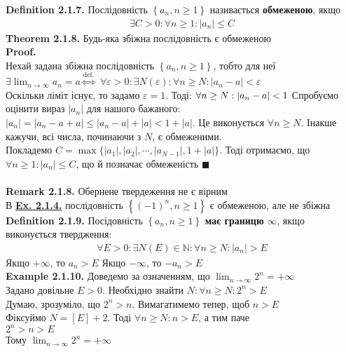 \documentclass[a4paper, 14pt]{extarticle}
\def\bigline{\vspace{5mm}\\}
\def\bigline{\vspace{5mm}\\}
\def\qed{$\blacksquare$}
\def\sequence#1{$\displaystyle \left\{ {#1}, n\geq1 \right\}$}
\def\limitdef#1#2#3#4#5{$\displaystyle \forall #1 > 0: \exists #2(#1): \forall #3 \geq #2: \left|#4 - #5\right| < #1$}
\begin{document}
	\textbf{Definition 2.1.7.} Послідовність \sequence{a_n} називається \textbf{обмеженою}, якщо \begin{align*}
	\exists C>0: \forall n \geq 1: |a_n|\leq C
	\end{align*}
	\textbf{Theorem 2.1.8.} Будь-яка збіжна послідовність є обмеженою\\
	\textbf{Proof.}\\
	Нехай задана збіжна послідовність \sequence{a_n}, тобто для неї\\ $\displaystyle \exists \lim_{n \to \infty} a_n = a \overset{\textrm{def.}}{\iff}$ \limitdef{\varepsilon}{N}{n}{a_n}{a}\\
	Оскільки ліміт існує, то задамо $\varepsilon = 1$. Тоді: $\forall n \geq N: \abs{a_n-a}<1$
	Спробуємо оцінити вираз $|a_n|$ для нашого бажаного:\\
	$|a_n| = |a_n - a + a| \leq |a_n-a|+|a| < 1 + |a|$. Це виконується $\forall n \geq N$. Інакше кажучи, всі числа, починаючи з $N$, є обмеженими.\\
	Покладемо $C=\max\{|a_1|,|a_2|,\cdots, |a_{N-1}|, 1+|a|\}$. Тоді отримаємо, що\\
	$\forall n\geq1: |a_n|\leq C$, що й позначає обмеженість \qed
	\\ \\
	\textbf{Remark 2.1.8.} Обернене твердеження не є вірним\\
	В \hyperlink{ex2.1.4.}{\textbf{Ex. 2.1.4.}} послідовність \sequence{(-1)^n} є обмеженою, але не збіжна
	\bigline
	\textbf{Definition 2.1.9.} Посідовність \sequence{a_n} \textbf{має границю} $\infty$, якщо виконується твердження: \begin{align*}
	\forall E>0: \exists N(E) \in \mathbb{N}: \forall n \geq N: |a_n|>E
	\end{align*}
	Якщо $+\infty$, то $a_n > E$ \hspace{0.5cm} Якщо $-\infty$, то $-a_n > E$
	\bigline
	\textbf{Example 2.1.10.} Доведемо за означенням, що $\displaystyle\lim_{n \to \infty} 2^n = +\infty$\\
	Задано довільне $E>0$. Необхідно знайти $N: \forall n \geq N: 2^n>E$\\
	Думаю, зрозуміло, що $2^n > n$. Вимагатимемо тепер, щоб $n > E$\\
	Фіксуймо $N=\left[ E \right] + 2$. Тоді $\forall n \geq N: n > E$, а тим паче\\
	$2^n > n > E$\\
	Тому $\displaystyle\lim_{n \to \infty} 2^n = +\infty$\\
\end{document}
